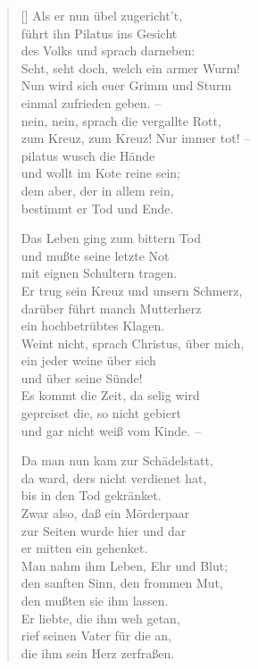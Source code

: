 \begin{multicols}{2}
\begin{verse}[\versewidth]
 Als er nun übel zugericht't,\\
führt ihn Pilatus ins Gesicht\\
des Volks und sprach darneben:\\
Seht, seht doch, welch ein armer Wurm!\\
Nun wird sich euer Grimm und Sturm\\
einmal zufrieden geben. –\\
nein, nein, sprach die vergallte Rott,\\
zum Kreuz, zum Kreuz! Nur immer tot! –\\
pilatus wusch die Hände\\
und wollt im Kote reine sein;\\
dem aber, der in allem rein,\\
bestimmt er Tod und Ende.

 Das Leben ging zum bittern Tod\\
und mußte seine letzte Not\\
mit eignen Schultern tragen.\\
Er trug sein Kreuz und unsern Schmerz,\\
darüber führt manch Mutterherz\\
ein hochbetrübtes Klagen.\\
Weint nicht, sprach Christus, über mich,\\
ein jeder weine über sich\\
und über seine Sünde!\\
Es kommt die Zeit, da selig wird\\
gepreiset die, so nicht gebiert\\
und gar nicht weiß vom Kinde. –

 Da man nun kam zur Schädelstatt,\\
da ward, ders nicht verdienet hat,\\
bis in den Tod gekränket.\\
Zwar also, daß ein Mörderpaar\\
zur Seiten wurde hier und dar\\
er mitten ein gehenket.\\
Man nahm ihm Leben, Ehr und Blut;\\
den sanften Sinn, den frommen Mut,\\
den mußten sie ihm lassen.\\
Er liebte, die ihm weh getan,\\
rief seinen Vater für die an,\\
die ihm sein Herz zerfraßen.


\end{verse}
\end{multicols}
